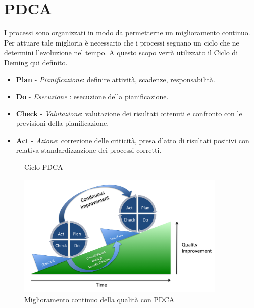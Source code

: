 \section{PDCA}\label{app:pdca}
I processi sono organizzati in modo da permetterne un miglioramento continuo.\\
Per attuare tale miglioria è necessario che i processi seguano un ciclo che ne determini l'evoluzione nel tempo.
A questo scopo verrà utilizzato il Ciclo di Deming qui definito.
\begin{itemize}
	\item \textbf{Plan} - \textit{Pianificazione}: definire attività, scadenze, responsabilità.
	\item \textbf{Do} - \textit{Esecuzione} : esecuzione della pianificazione.
	\item \textbf{Check} - \textit{Valutazione}: valutazione dei risultati ottenuti e confronto con le previsioni della pianificazione. 
	\item \textbf{Act} - \textit{Azione}: correzione delle criticità, presa d’atto di risultati positivi con relativa standardizzazione dei processi corretti.
\end{itemize}
%	
\begin{figure}[H]	
	\centering
	
	\caption{Ciclo PDCA}
\end{figure}
\begin{figure}[H]
	\centering
	\includegraphics[width=10cm]{PDCAProcess}
	\caption{Miglioramento continuo della qualità con PDCA}
\end{figure}